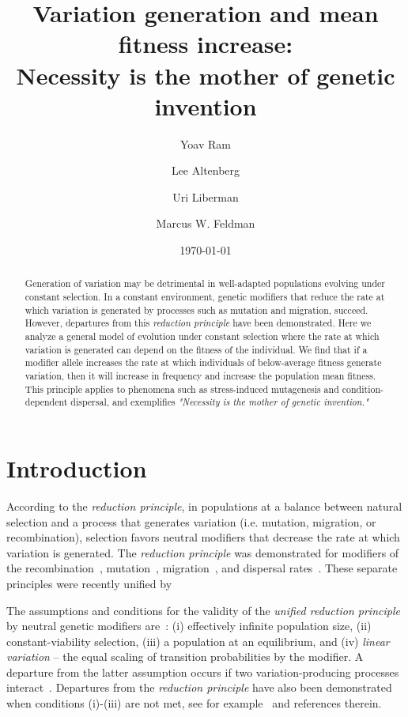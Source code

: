 \documentclass[9pt, a4paper, twocolumn]{extarticle}
\title{Variation generation and mean fitness increase: \\ Necessity is the mother of genetic invention}
\author[a]{Yoav Ram}
\author[b]{Lee Altenberg}
\author[c]{Uri Liberman}
\author[a]{Marcus W. Feldman}
\affil[a]{Department of Biology, Stanford University, Stanford, CA}
\affil[b]{Information and Computer Sciences, University of Hawai`i at M{\=a}noa, Honolulu, HI}
\affil[c]{School of Mathematical Sciences, Tel Aviv University, Israel}
\date{\today}
\begin{document}
\maketitle

\begin{abstract}
Generation of variation may be detrimental in well-adapted populations evolving under constant selection.
In a constant environment, genetic modifiers that reduce the rate at which variation is generated by processes such as mutation and migration, succeed.
However, departures from this \emph{reduction principle} have been demonstrated.
Here we analyze a general model of evolution under constant selection where the rate at which variation is generated can depend on the fitness of the individual.
We find that if a modifier allele increases the rate at which individuals of below-average fitness generate variation, then it will increase in frequency and increase the  population mean fitness.
This principle applies to phenomena such as stress-induced mutagenesis and condition-dependent dispersal,
and exemplifies \emph{"Necessity is the mother of genetic invention."}
\end{abstract}

\section*{Introduction}

According to the \emph{reduction principle}, in populations at a balance between natural selection and a process that generates variation (i.e. mutation, migration, or recombination), selection favors neutral modifiers that decrease the rate at which variation is generated. 
The \emph{reduction principle} was demonstrated for modifiers of the recombination~\citep{Feldman1972}, mutation~\citep{Liberman1986a}, migration~\citep{Feldman1986}, and dispersal rates~\citep{Altenberg1987}.
These separate principles were recently unified by~\citet{Altenberg2017}

The assumptions and conditions for the validity of the \emph{unified reduction principle} by neutral genetic modifiers are~\citep{Altenberg2017}:
(i) effectively infinite population size, (ii) constant-viability selection, (iii) a population at an equilibrium, and (iv) \emph{linear variation} -- the equal scaling of transition probabilities by the modifier.
A departure from the latter assumption occurs if two variation-producing processes interact~\citep{Feldman1980,Altenberg2012b}.
Departures from the \emph{reduction principle} have also been demonstrated when conditions (i)-(iii) are not met, see for example~\citet{Holsinger1986} and references therein.
\end{document}
